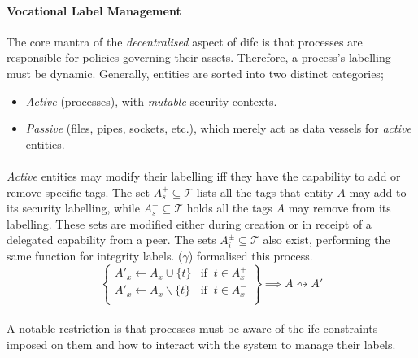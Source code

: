 \paragraph{Vocational Label Management} The core mantra of the \textit{decentralised} aspect of \acrshort{difc} is that processes are responsible for policies governing their assets. Therefore, a process's labelling must be dynamic. Generally, entities are sorted into two distinct categories;

\begin{itemize}
    \item \textit{Active} (processes), with \textit{mutable} security contexts.
    \item \textit{Passive} (files, pipes, sockets, etc.), which merely act as data vessels for \textit{active} entities.
\end{itemize}

\paragraph{} \textit{Active} entities may modify their labelling iff they have the capability to add or remove specific tags. The set $A_{s}^{+} \subseteq \mathcal{T}$ lists all the tags that entity $A$ may add to its security labelling, while $A_{s}^{-} \subseteq \mathcal{T}$ holds all the tags $A$ may remove from its labelling. These sets are modified either during creation or in receipt of a delegated capability from a peer. The sets $A_{i}^{\pm} \subseteq \mathcal{T}$ also exist, performing the same function for integrity labels. ($\gamma$) formalised this process.
\begin{equation}
    \left\{\begin{array}{lr}
        A'_x \leftarrow A_x \cup \{t\} & \text{if} \;\; t \in A_{x}^{+} \\
        A'_x \leftarrow A_x \smallsetminus \{t\} & \text{if} \;\; t \in A_{x}^{-} \\
    \end{array}\right\} \implies A \rightsquigarrow A' \tag{$\gamma$}
\end{equation}

\paragraph{} A notable restriction is that processes must be aware of the \acrshort{ifc} constraints imposed on them and how to interact with the system to manage their labels.

